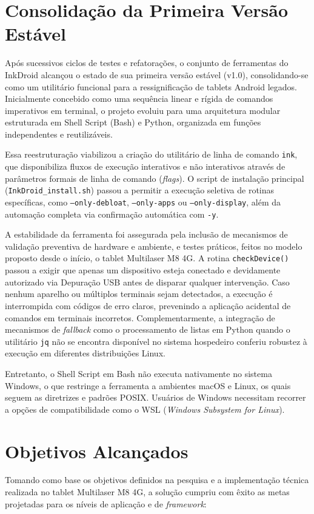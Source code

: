 \documentclass[
    12pt,
    openright,
    oneside,
    a4paper,
    english,
    brazilian
    ]{abntex2}
\begin{document}
\section{Consolidação da Primeira Versão Estável}

Após sucessivos ciclos de testes e refatorações, o conjunto de ferramentas do InkDroid alcançou o estado de sua primeira versão estável (v1.0), consolidando-se como um utilitário funcional para a ressignificação de tablets Android legados. Inicialmente concebido como uma sequência linear e rígida de comandos imperativos em terminal, o projeto evoluiu para uma arquitetura modular estruturada em Shell Script (Bash) e Python, organizada em funções independentes e reutilizáveis.

Essa reestruturação viabilizou a criação do utilitário de linha de comando \texttt{ink}, que disponibiliza fluxos de execução interativos e não interativos através de parâmetros formais de linha de comando (\textit{flags}). O script de instalação principal (\texttt{InkDroid\_install.sh}) passou a permitir a execução seletiva de rotinas específicas, como \texttt{--only-debloat}, \texttt{--only-apps} ou \texttt{--only-display}, além da automação completa via confirmação automática com \texttt{-y}.

A estabilidade da ferramenta foi assegurada pela inclusão de mecanismos de validação preventiva de hardware e ambiente, e testes práticos, feitos no modelo proposto desde o início, o tablet Multilaser M8 4G. A rotina \texttt{checkDevice()} passou a exigir que apenas um dispositivo esteja conectado e devidamente autorizado via Depuração USB antes de disparar qualquer intervenção. Caso nenhum aparelho ou múltiplos terminais sejam detectados, a execução é interrompida com códigos de erro claros, prevenindo a aplicação acidental de comandos em terminais incorretos. Complementarmente, a integração de mecanismos de \textit{fallback} como o processamento de listas em Python quando o utilitário \texttt{jq} não se encontra disponível no sistema hospedeiro conferiu robustez à execução em diferentes distribuições Linux.

Entretanto, o Shell Script em Bash não executa nativamente no sistema Windows, o que restringe a ferramenta a ambientes macOS e Linux, os quais seguem as diretrizes e padrões POSIX. Usuários de Windows necessitam recorrer a opções de compatibilidade como o WSL (\textit{Windows Subsystem for Linux}).

\section{Objetivos Alcançados}
Tomando como base os objetivos definidos na pesquisa e a implementação técnica realizada no tablet Multilaser M8 4G, a solução cumpriu com êxito as metas projetadas para os níveis de aplicação e de \textit{framework}:
\end{document}
